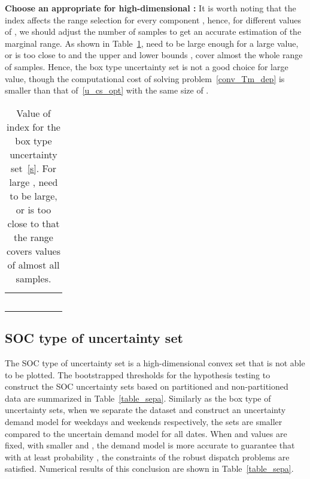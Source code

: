\documentclass[10pt,twocolumn,twoside,english]{IEEEtran}
\begin{document}
\textbf{Choose an appropriate  for high-dimensional :}
It is worth noting that the index  affects the range selection for every component , hence, for different values of , we should adjust the number of samples  to get an accurate estimation of the marginal range. As shown in Table~\ref{table_nt},   need to be large enough for a large  value, or  is too close to  and the upper and lower bounds ,  cover almost the whole range of samples. Hence, the box type uncertainty set is not a good choice for large  value, though the computational cost of solving problem~\eqref{conv_Tm_dep} is smaller than that of~\eqref{u_cs_opt} with the same size of .
\begin{table}[t!]
\centering
\begin{tabular}{|c|c|c|c|c|c|}
  \hline
                 &      &      &             &             &  \\ \hline
          &            &             &          &       &  \\ \hline
          &            &             &          &       &    \\ \hline
          &            &             &          &       &  \\ \hline
          &            &             &      &       &    \\ \hline
          &            &             &          &    &   \\ \hline
 \end{tabular}
     \caption{Value of index  for the box type uncertainty set~\eqref{s}. For large ,  need to be large, or  is too close to  that the range covers values of almost all samples.}
     \label{table_nt}
    \vspace{-15pt}
\end{table}




\subsection{SOC type of uncertainty set}
The SOC type of uncertainty set is a high-dimensional convex set that is not able to be plotted. The bootstrapped thresholds for the hypothesis testing to construct the SOC uncertainty sets based on partitioned and non-partitioned data are summarized in Table~\ref{table_sepa}. Similarly as the box type of uncertainty sets, when we separate the dataset and construct an uncertainty demand model for weekdays and weekends respectively, the sets are smaller compared to the uncertain demand model for all dates. When  and  values are fixed, with smaller  and , the demand model  is more accurate to guarantee that with at least probability , the constraints of the robust dispatch problems are satisfied. Numerical results of this conclusion are shown in Table~\ref{table_sepa}. 
\end{document}
